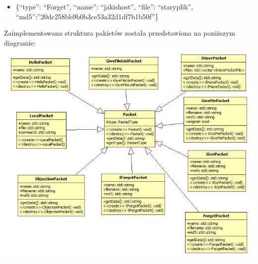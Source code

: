 \documentclass[10pt,a4paper]{article}
\begin{document}
\begin{itemize}
\begin{itemize}
\item \{“type”: “Forget”, “name”: “jakishost”, “file”: “staryplik”, “md5”:”20dc258bb9b0b3ce53a32d1df7b1b50f”\}
\end{itemize}
\end{itemize}
Zaimplementowana struktura pakietów została przedstawiona na poniższym diagramie:\\
\includegraphics[width=\linewidth]{packet}
\end{document}
